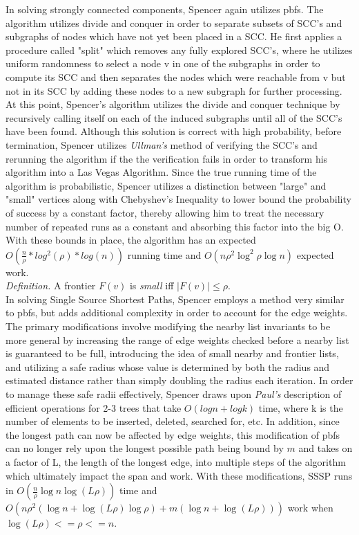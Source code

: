 \documentclass[paper=a4, fontsize=11pt]{scrartcl} %
\numberwithin{equation}{section} %
\numberwithin{figure}{section} %
\numberwithin{table}{section} %
\begin{document}
In solving strongly connected components, Spencer again utilizes pbfs. The algorithm utilizes divide and conquer in order to separate subsets of SCC's and subgraphs of nodes which have not yet been placed in a SCC. He first applies a procedure called "split" which removes any fully explored SCC's, where he utilizes uniform randomness to select a node v in one of the subgraphs in order to compute its SCC and then separates the nodes which were reachable from v but not in its SCC by adding these nodes to a new subgraph for further processing. At this point, Spencer's algorithm utilizes the divide and conquer technique by recursively calling itself on each of the induced subgraphs until all of the SCC's have been found. Although this solution is correct with high probability, before termination, Spencer utilizes \textit{Ullman's\cite{UY91}} method of verifying the SCC's and rerunning the algorithm if the the verification fails in order to transform his algorithm into a Las Vegas Algorithm. Since the true running time of the algorithm is probabilistic, Spencer utilizes a distinction between "large" and "small" vertices along with Chebyshev's Inequality to lower bound the probability of success by a constant factor, thereby allowing him to treat the necessary number of repeated runs as a constant and absorbing this factor into the big O. With these bounds in place, the algorithm has an expected $O(\frac{n}{\rho}*log^2(\rho)*log(n))$ running time and $O(n\rho^2\log^2{\rho}\log{n})$ expected work.  \\ 

\textit{Definition.} A frontier $F(v)$ is \textit{small} iff $|F(v)|\le\rho$.\\ 

In solving Single Source Shortest Paths, Spencer employs a method very similar to pbfs, but adds additional complexity in order to account for the edge weights. The primary modifications involve modifying the nearby list invariants to be more general by increasing the range of edge weights checked before a nearby list is guaranteed to be full, introducing the idea of small nearby and frontier lists, and utilizing a safe radius whose value is determined by both the radius and estimated distance rather than simply doubling the radius each iteration. In order to manage these safe radii effectively, Spencer draws upon \textit{Paul's\cite{P83}} description of efficient operations for 2-3 trees that take $O(logn+logk)$ time, where k is the number of elements to be inserted, deleted, searched for, etc. In addition, since the longest path can now be affected by edge weights, this modification of pbfs can no longer rely upon the longest possible path being bound by $m$ and takes on a factor of L, the length of the longest edge, into multiple steps of the algorithm which ultimately impact the span and work. With these modifications, SSSP runs in  $O(\frac{n}{\rho}\log{n}\log{(L\rho)})$ time and $O(n\rho^2(\log{n} + \log{(L\rho)}\log{\rho}) + m(\log{n} + \log{(L\rho)}))$ work when $\log{(L\rho)} <= \rho <= n$.
\end{document}
